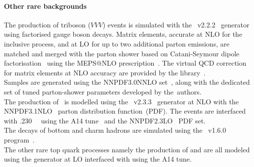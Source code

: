 \paragraph{Other rare backgrounds}
The production of triboson ($VVV$) events is simulated with the 
\sherpa~v2.2.2~\cite{Bothmann:2019yzt} generator using factorised gauge boson decays. 
Matrix elements, accurate at NLO for the inclusive process, and at LO for up to 
two additional parton emissions, are matched and merged with the \sherpa parton 
shower based on Catani-Seymour dipole factorisation~\cite{Gleisberg:2008fv,Schumann:2007mg} 
using the MEPS@NLO prescription~\cite{Hoeche:2011fd,Hoeche:2012yf,Catani:2001cc,Hoeche:2009rj}. 
The virtual QCD correction for matrix elements at NLO accuracy are 
provided by the \openloops library~\cite{Cascioli:2011va,Denner:2016kdg}.\\
Samples are generated using the \textsc{NNPDF3.0NNLO} set~\cite{Ball:2014uwa}, along with
the dedicated set of tuned parton-shower parameters developed by the~\sherpa authors.\\
The production of \tttt\ is modelled using the \mgamc~v2.3.3~\cite{Alwall:2014hca}
generator at NLO with the \textsc{NNPDF3.1NLO}~\cite{Ball:2014uwa} parton distribution function~(PDF).
The events are interfaced with \pythia.230~\cite{Sjostrand:2014zea}~ using the A14 tune~\cite{ATL-PHYS-PUB-2014-021} and the
\textsc{NNPDF2.3LO}~\cite{Ball:2014uwa} PDF set.\\
The decays of bottom and charm hadrons are simulated using the \evtgen\ v1.6.0 program~\cite{Lange:2001uf}. \\
The other rare top quark processes namely the production of \ttWW and \ttt are all modeled using the \mgamc generator at LO interfaced with \pythia using the A14 tune.
